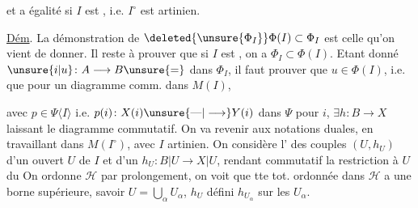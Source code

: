 et  a égalité si $I$ est , i.e. $I^\circ$ est
artinien.

\uline{Dém}. La démonstration de $\deleted{\unsure{\Phi_I}}\Phi(I)\subset\Phi_I$
est celle qu'on vient de donner. Il reste
à prouver que si $I$ est , on a
$\Phi_I\subset\Phi(I)$. Etant donné $\unsure{i|u}\colon A\longrightarrow B\unsure{=}$
dans $\Phi_I$, il faut prouver que $u\in\Phi(I)$, i.e.
que pour un diagramme comm. dans $M(I)$,


avec $p\in\Psi\langle I\rangle$ i.e. $p(i)\colon X(i)\unsure{\text{---}|\longrightarrow}Y(i)$
dans $\Psi$ pour  $i$, $\exists h\colon B\longrightarrow X$ laissant le
diagramme commutatif. On va revenir
aux notations duales, en travaillant dans
$M(I^\circ)$, avec $I$ artinien. On considère
l'  des couples $(U,h_U)$ d'un ouvert $U$
de $I$ et d'un $h_U\colon B|U\longrightarrow X|U$,
rendant commutatif la restriction à $U$
du  On ordonne $\mathcal H$ par prolongement,
on voit que tte  tot. ordonnée  dans
$\mathcal H$ a une borne supérieure, savoir
$U=\bigcup_\alpha U_\alpha$, $h_U$ défini  $h_{U_\alpha}$ sur les $U_\alpha$.

